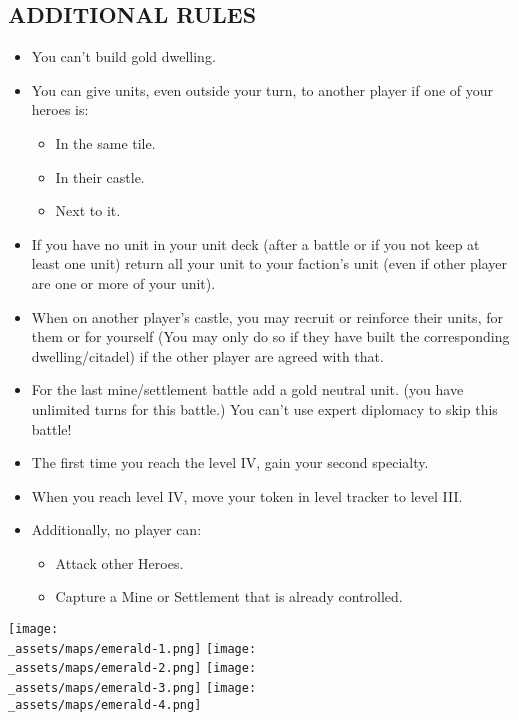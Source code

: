 \begin{multicols*}{2}
\subsection*{\MakeUppercase{Additional Rules}}
\begin{itemize}
    \item You can't build gold dwelling.
    \item You can give units, even outside your turn, to another player if one of your heroes is:
    \begin{itemize}
        \item In the same tile. 
        \item In their castle.
        \item Next to it.
    \end{itemize}
    \item If you have no unit in your unit deck (after a battle or if you not keep at least one unit) return all your unit to your faction's unit (even if other player are one or more of your unit).
    \item When on another player's castle, you may recruit or reinforce their units, for them or for yourself (You may only do so if they have built the corresponding dwelling/citadel) if the other player are agreed with that.
    \item For the last mine/settlement battle add a gold neutral unit. (you have unlimited turns for this battle.) You can't use expert diplomacy to skip this battle!
    \item The first time you reach the level IV, gain your second specialty.
    \item When you reach level IV, move your token in level tracker to level III.
    \item Additionally, no player can:
    \begin{itemize}
        \item Attack other Heroes.
        \item Capture a Mine or Settlement that is already controlled.
    \end{itemize}
\end{itemize}

\vspace{3em}

\begin{center}
  \texttt{[image: \\\_assets/maps/emerald-1.png]}
  \vspace{3em}
  \texttt{[image: \\\_assets/maps/emerald-2.png]}
  \vspace{3em}
  \texttt{[image: \\\_assets/maps/emerald-3.png]}
  \vspace{3em}
  \texttt{[image: \\\_assets/maps/emerald-4.png]}
\end{center}

\end{multicols*}
